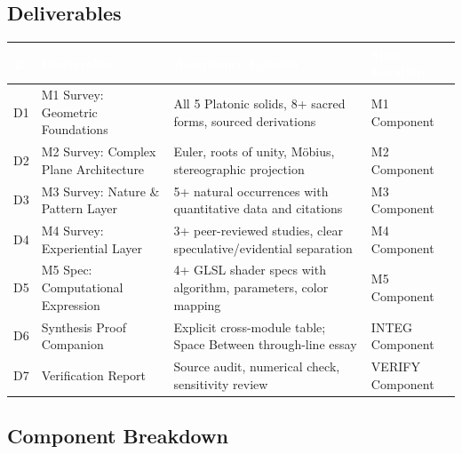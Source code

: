 \documentclass[11pt,letterpaper]{article}
\newcommand{\tableheader}[1]{\textbf{\sffamily\textcolor{white}{#1}}}
\begin{document}
\subsection{Deliverables}

\begin{center}
\begin{tabularx}{\textwidth}{C{0.8cm}L{3.5cm}XL{2.5cm}}
\toprule
{}
\tableheader{\#} & \tableheader{Deliverable} & \tableheader{Acceptance Criteria} & \tableheader{Spec Location} \\
\midrule
D1 & M1 Survey: Geometric Foundations & All 5 Platonic solids, 8+ sacred forms, sourced derivations & M1 Component \\
D2 & M2 Survey: Complex Plane Architecture & Euler, roots of unity, M\"{o}bius, stereographic projection & M2 Component \\
D3 & M3 Survey: Nature \& Pattern Layer & 5+ natural occurrences with quantitative data and citations & M3 Component \\
D4 & M4 Survey: Experiential Layer & 3+ peer-reviewed studies, clear speculative/evidential separation & M4 Component \\
D5 & M5 Spec: Computational Expression & 4+ GLSL shader specs with algorithm, parameters, color mapping & M5 Component \\
D6 & Synthesis Proof Companion & Explicit cross-module table; Space Between through-line essay & INTEG Component \\
D7 & Verification Report & Source audit, numerical check, sensitivity review & VERIFY Component \\
\bottomrule
\end{tabularx}
\end{center}

\subsection{Component Breakdown}
\end{document}
